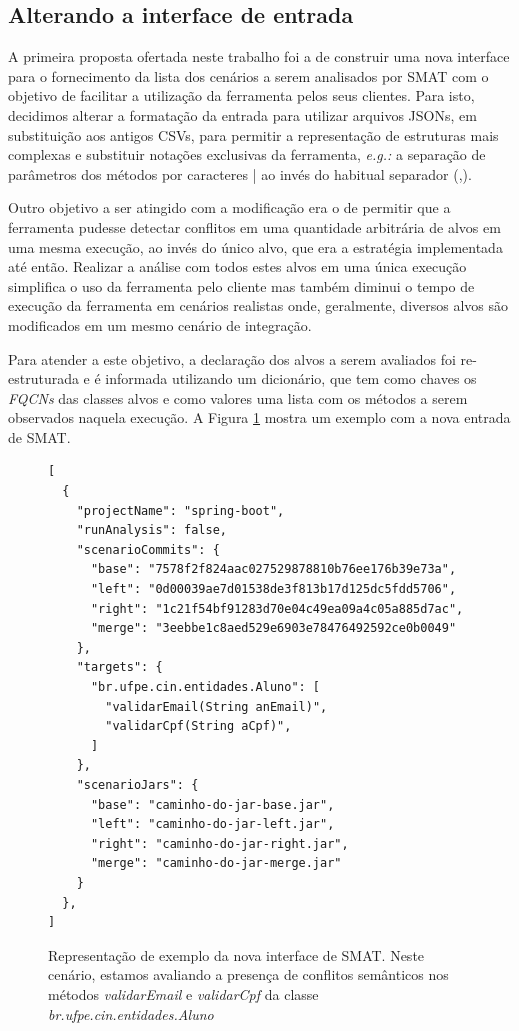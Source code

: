 \documentclass[12pt]{article}
\begin{document}
\subsection{Alterando a interface de entrada}
A primeira proposta ofertada neste trabalho foi a de construir uma nova interface para o fornecimento da lista dos cenários a serem analisados por SMAT com o objetivo de facilitar a utilização da ferramenta pelos seus clientes. Para isto, decidimos alterar a formatação da entrada para utilizar arquivos JSONs, em substituição aos antigos CSVs, para permitir a representação de estruturas mais complexas e substituir notações exclusivas da ferramenta, \textit{e.g.:} a separação de parâmetros dos métodos por caracteres | ao invés do habitual separador (,).

Outro objetivo a ser atingido com a modificação era o de permitir que a ferramenta pudesse detectar conflitos em uma quantidade arbitrária de alvos em uma mesma execução, ao invés do único alvo, que era a estratégia implementada até então. Realizar a análise com todos estes alvos em uma única execução simplifica o uso da ferramenta pelo cliente mas também diminui o tempo de execução da ferramenta em cenários realistas onde, geralmente, diversos alvos são modificados em um mesmo cenário de integração.

Para atender a este objetivo, a declaração dos alvos a serem avaliados foi re-estruturada e é informada utilizando um dicionário, que tem como chaves os \textit{FQCNs} das classes alvos e como valores uma lista com os métodos a serem observados naquela execução. A Figura \ref{fig:interface-nova} mostra um exemplo com a nova entrada de SMAT.

\begin{figure}[H]
    \begin{verbatim}
[
  {
    "projectName": "spring-boot",
    "runAnalysis": false,
    "scenarioCommits": {
      "base": "7578f2f824aac027529878810b76ee176b39e73a",
      "left": "0d00039ae7d01538de3f813b17d125dc5fdd5706",
      "right": "1c21f54bf91283d70e04c49ea09a4c05a885d7ac",
      "merge": "3eebbe1c8aed529e6903e78476492592ce0b0049"
    },
    "targets": {
      "br.ufpe.cin.entidades.Aluno": [
        "validarEmail(String anEmail)",
        "validarCpf(String aCpf)",
      ]
    },
    "scenarioJars": {
      "base": "caminho-do-jar-base.jar",
      "left": "caminho-do-jar-left.jar",
      "right": "caminho-do-jar-right.jar",
      "merge": "caminho-do-jar-merge.jar"
    }
  },
]
    \end{verbatim}
    \caption{Representação de exemplo da nova interface de SMAT. Neste cenário, estamos avaliando a presença de conflitos semânticos nos métodos \textit{validarEmail} e \textit{validarCpf} da classe \textit{br.ufpe.cin.entidades.Aluno}}
    \label{fig:interface-nova}
\end{figure}
\end{document}
